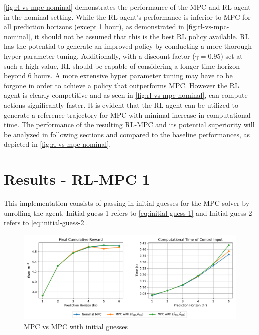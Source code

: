 \autoref{fig:rl-vs-mpc-nominal} demonstrates the performance of the MPC and RL agent in the nominal setting. While the RL agent's performance is inferior to MPC for all prediction horizons (except 1 hour), as demonstrated in \autoref{fig:rl-vs-mpc-nominal}, it should not be assumed that this is the best RL policy available. RL has the potential to generate an improved policy by conducting a more thorough hyper-parameter tuning. Additionally, with a discount factor ($\gamma = 0.95$) set at such a high value, RL should be capable of considering a longer time horizon beyond 6 hours. A more extensive hyper parameter tuning may have to be forgone in order to achieve a policy that outperforms MPC. However the RL agent is clearly competitive and as seen in \autoref{fig:rl-vs-mpc-nominal}, can compute actions significantly faster. It is evident that the RL agent can be utilized to generate a reference trajectory for MPC with minimal increase in computational time. The performance of the resulting RL-MPC and its potential superiority will be analyzed in following sections and compared to the baseline performances, as depicted in \autoref{fig:rl-vs-mpc-nominal}.

\section{Results - RL-MPC 1}
This implementation consists of passing in initial guesses for the MPC solver by unrolling the agent. Initial guess 1 refers to \autoref{eq:initial-guess-1} and Initial guess 2 refers to \autoref{eq:initial-guess-2}.
\begin{figure}[H]
	\centering
	\includegraphics[width=\textwidth]{figures/rl_mpc_impl_1.pdf}
	\caption{MPC vs MPC with initial guesses}
	\label{fig:rlmpc-impl1}
\end{figure}


